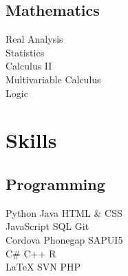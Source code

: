 \documentclass[letterpaper]{deedy-resume} %
\begin{document}
\begin{minipage}[t]{0.33\textwidth}
\sectionspace %

\subsection{Mathematics}

Real Analysis \\
Statistics  \\
Calculus II \\
Multivariable Calculus \\
Logic 


\sectionspace %


\section{Skills}

\subsection{Programming}

Python \textbullet{} Java \textbullet{} HTML \& CSS  \\
JavaScript \textbullet{} SQL \textbullet{} Git \\
Cordova Phonegap \textbullet{} SAPUI5 \\
C\# \textbullet{} C++ \textbullet{} R   \\ 
\LaTeX \textbullet{} SVN \textbullet{} PHP

\sectionspace %


\end{minipage} %
\hfill
%
%
\end{document}
